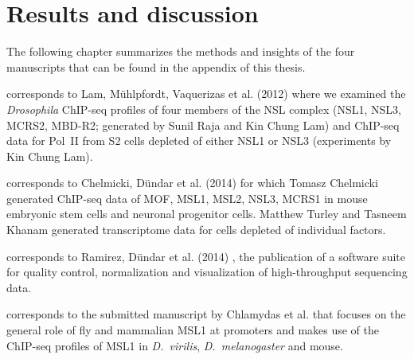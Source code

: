 \chapter{Results and discussion} %
\label{Results} %
\fancyfoot[C]{\thepage}

The following chapter summarizes the methods and insights of the four manuscripts that can be found in the appendix of this thesis.

 corresponds to Lam, Mühlpfordt, Vaquerizas et al. (2012) \citep{Lam2012} where we examined the \textit{Drosophila} ChIP-seq profiles of four members of the NSL complex (NSL1, NSL3, MCRS2, MBD-R2; generated by Sunil Raja and Kin Chung Lam) and ChIP-seq data for Pol~II from S2 cells depleted of either NSL1 or NSL3 (experiments by Kin Chung Lam).

 corresponds to Chelmicki, Dündar et al. (2014) \citep{Chelmicki2014} for which Tomasz Chelmicki generated ChIP-seq data of MOF, MSL1, MSL2, NSL3, MCRS1 in mouse embryonic stem cells and neuronal progenitor cells. Matthew Turley and Tasneem Khanam generated transcriptome data for cells depleted of individual factors.

 corresponds to Ramirez, Dündar et al. (2014) \citep{Ramirez2014}, the publication of a software suite for quality control, normalization and visualization of high-throughput sequencing data.

 corresponds to the submitted manuscript by Chlamydas et al. that focuses on the general role of fly and mammalian MSL1 at promoters and makes use of the ChIP-seq profiles of MSL1 in \textit{D.~virilis}, \textit{D.~melanogaster} and mouse.
